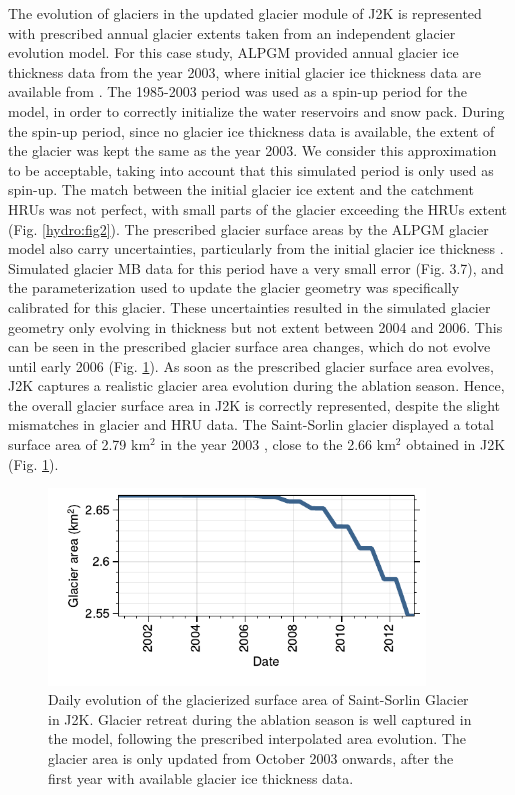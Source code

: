 The evolution of glaciers in the updated glacier module of J2K is represented with prescribed annual glacier extents taken from an independent glacier evolution model. For this case study, ALPGM provided annual glacier ice thickness data from the year 2003, where initial glacier ice thickness data are available from \citet{farinotti_consensus_2019}. The 1985-2003 period was used as a spin-up period for the model, in order to correctly initialize the water reservoirs and snow pack. During the spin-up period, since no glacier ice thickness data is available, the extent of the glacier was kept the same as the year 2003. We consider this approximation to be acceptable, taking into account that this simulated period is only used as spin-up. The match between the initial glacier ice extent and the catchment HRUs was not perfect, with small parts of the glacier exceeding the HRUs extent (Fig. \ref{hydro:fig2}). The prescribed glacier surface areas by the ALPGM glacier model also carry uncertainties, particularly from the initial glacier ice thickness \citep{bolibar_deep_2020}. Simulated glacier MB data for this period have a very small error (Fig. 3.7), and the parameterization used to update the glacier geometry was specifically calibrated for this glacier. These uncertainties resulted in the simulated glacier geometry only evolving in thickness but not extent between 2004 and 2006. This can be seen in the prescribed glacier surface area changes, which do not evolve until early 2006 (Fig. \ref{hydro:fig3}). As soon as the prescribed glacier surface area evolves, J2K captures a realistic glacier area evolution during the ablation season. Hence, the overall glacier surface area in J2K is correctly represented, despite the slight mismatches in glacier and HRU data. The Saint-Sorlin glacier displayed a total surface area of 2.79 km$^{2}$ in the year 2003 \citep{gardent_multitemporal_2014}, close to the 2.66 km$^{2}$ obtained in J2K (Fig. \ref{hydro:fig3}). 

\begin{figure}[h]
\centering
\includegraphics[width=10cm]{Figures/hydro/Figure_3.pdf}
\caption{Daily evolution of the glacierized surface area of Saint-Sorlin Glacier in J2K. Glacier retreat during the ablation season is well captured in the model, following the prescribed interpolated area evolution. The glacier area is only updated from October 2003 onwards, after the first year with available glacier ice thickness data.} 
\label{hydro:fig3}
\end{figure}

